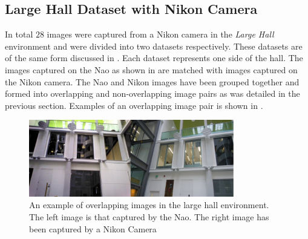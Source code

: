 \documentclass[11pt]{report}
\begin{document}




\subsection{Large Hall Dataset with Nikon Camera}
\label{sec:nikonlargeHall}
In total $28$ images were captured from a Nikon camera in the \textit{Large Hall} environment and were divided into two datasets respectively. These datasets are of the same form discussed in . Each dataset represents one side of the hall. The images captured on the Nao as shown in  are matched with images captured on the Nikon camera. The Nao and Nikon images have been grouped together and formed into overlapping and non-overlapping image pairs as was detailed in the previous section. Examples of an overlapping image pair is shown in .\\

\begin{figure}[h!] 
  \centering
    \includegraphics[width=0.8\textwidth]{../Drawings/camera/comparelargeHall.jpg}
    \caption{An example of overlapping images in the large hall environment. The left image is that captured by the Nao. The right image has been captured by a Nikon Camera}
    \label{fig:cameraOverlaplargeHall}
\end{figure}
\end{document}
